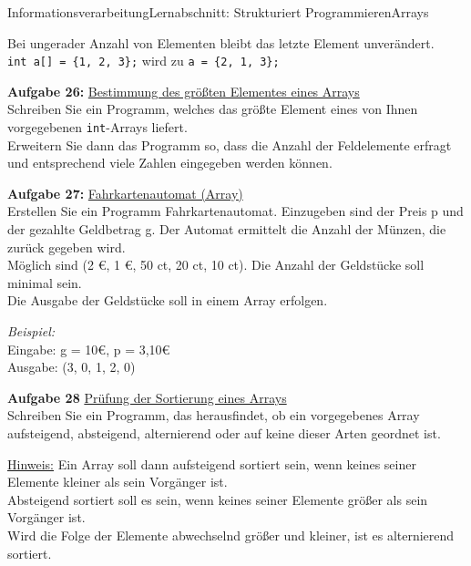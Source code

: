 \documentclass[oneside,openany,headings=optiontotoc,11pt,numbers=noenddot]{scrreprt}
\begin{document}
\begin{worksheet}{Informationsverarbeitung}{Lernabschnitt: Strukturiert Programmieren}{Arrays}
\begin{framed}
			Bei ungerader Anzahl von Elementen bleibt das letzte Element unverändert.\\
			\lstinline[style=JavaInputStyle]|int a[] = {1, 2, 3};| wird zu \lstinline[style=JavaInputStyle]|a = {2, 1, 3};|\\
			\par\noindent
			\textbf{Aufgabe 26:} \underline{Bestimmung des größten Elementes eines Arrays}\\
			Schreiben Sie ein Programm, welches das größte Element eines von Ihnen vorgegebenen \lstinline[style=JavaInputStyle]|int|-Arrays liefert.\\
			Erweitern Sie dann das Programm so, dass die Anzahl der Feldelemente erfragt und entsprechend viele Zahlen eingegeben werden können.\\
			\par\noindent
			\textbf{Aufgabe 27:} \underline{Fahrkartenautomat (Array)}\\
			Erstellen Sie ein Programm \grqq{}Fahrkartenautomat\grqq{}. Einzugeben sind der Preis p und der gezahlte Geldbetrag g. Der Automat ermittelt die Anzahl der Münzen, die zurück gegeben wird.\\
			Möglich sind (2 \euro{}, 1 \euro{}, 50 ct, 20 ct, 10 ct). Die Anzahl der Geldstücke soll minimal sein.\\
			Die Ausgabe der Geldstücke soll in einem Array erfolgen.\\
			\par\noindent
			\textit{Beispiel:}\\
			Eingabe: g = 10\euro{}, p = 3,10\euro{}\\
			Ausgabe: (3, 0, 1, 2, 0)\\
			\par\noindent
			\textbf{Aufgabe 28} \underline{Prüfung der Sortierung eines Arrays}\\
			Schreiben Sie ein Programm, das herausfindet, ob ein vorgegebenes Array aufsteigend, absteigend, alternierend oder auf keine dieser Arten geordnet ist.\\
			\par\noindent
			\underline{Hinweis:} Ein Array soll dann aufsteigend sortiert sein, wenn keines seiner Elemente kleiner als sein Vorgänger ist.\\
			Absteigend sortiert soll es sein, wenn keines seiner Elemente größer als sein Vorgänger ist.\\
			Wird die Folge der Elemente abwechselnd größer und kleiner, ist es alternierend sortiert.
		\end{framed}
	\end{worksheet}
\end{document}
